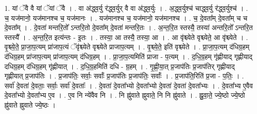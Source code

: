 \documentclass[17pt]{extarticle}
\begin{document}
1. यां ॅवै वै यां ॅयां ॅवै । . वा अ॑द्ध्व॒र्यु र॑द्ध्व॒र्युर् वै वा अ॑द्ध्व॒र्युः । . अ॒द्ध्व॒र्युश्च॑ चाद्ध्व॒र्यु र॑द्ध्व॒र्युश्च॑ । . च॒ यज॑मानो॒ यज॑मानश्च च॒ यज॑मानः । . यज॑मानश्च च॒ यज॑मानो॒ यज॑मानश्च । . च॒ दे॒वता᳚म् दे॒वता᳚म् च च दे॒वता᳚म् । . दे॒वता॑ मन्तरि॒तो᳚ ऽन्तरि॒तो दे॒वता᳚म् दे॒वता॑ मन्तरि॒तः । . अ॒न्त॒रि॒त स्तस्यै॒ तस्या॑ अन्तरि॒तो᳚ ऽन्तरि॒त स्तस्यै᳚ । . अ॒न्त॒रि॒त इत्य॑न्तः - इ॒तः । . तस्या॒ आ तस्यै॒ तस्या॒ आ । . आ वृ॑श्च्येते वृश्च्येते॒ आ वृ॑श्च्येते । . वृ॒श्च्ये॒ते॒ प्रा॒जा॒प॒त्यम् प्रा॑जाप॒त्यं ॅवृ॑श्च्येते वृश्च्येते प्राजाप॒त्यम् । . वृ॒श्च्ये॒ते॒ इति॑ वृश्च्येते । . प्रा॒जा॒प॒त्यम् द॑धिग्र॒हम् द॑धिग्र॒हम् प्रा॑जाप॒त्यम् प्रा॑जाप॒त्यम् द॑धिग्र॒हम् । . प्रा॒जा॒प॒त्यमिति॑ प्राजा - प॒त्यम् । . द॒धि॒ग्र॒हम् गृ॑ह्णीयाद् गृह्णीयाद् दधिग्र॒हम् द॑धिग्र॒हम् गृ॑ह्णीयात् । . द॒धि॒ग्र॒हमिति॑ दधि - ग्र॒हम् । . गृ॒ह्णी॒या॒त् प्र॒जाप॑तिः प्र॒जाप॑तिर् गृह्णीयाद् गृह्णीयात् प्र॒जाप॑तिः । . प्र॒जाप॑तिः॒ सर्वाः॒ सर्वाः᳚ प्र॒जाप॑तिः प्र॒जाप॑तिः॒ सर्वाः᳚ । . प्र॒जाप॑ति॒रिति॑ प्र॒जा - प॒तिः॒ । . सर्वा॑ दे॒वता॑ दे॒वताः॒ सर्वाः॒ सर्वा॑ दे॒वताः᳚ । . दे॒वता॑ दे॒वता᳚भ्यो दे॒वता᳚भ्यो दे॒वता॑ दे॒वता॑ दे॒वता᳚भ्यः । . दे॒वता᳚भ्य ए॒वैव दे॒वता᳚भ्यो दे॒वता᳚भ्य ए॒व । . ए॒व नि न्ये॑वैव नि । . नि ह्नु॑वाते ह्नुवाते॒ नि नि ह्नु॑वाते । . ह्नु॒वा॒ते॒ ज्ये॒ष्ठो ज्ये॒ष्ठो ह्नु॑वाते ह्नुवाते ज्ये॒ष्ठः । \newline
\end{document}

